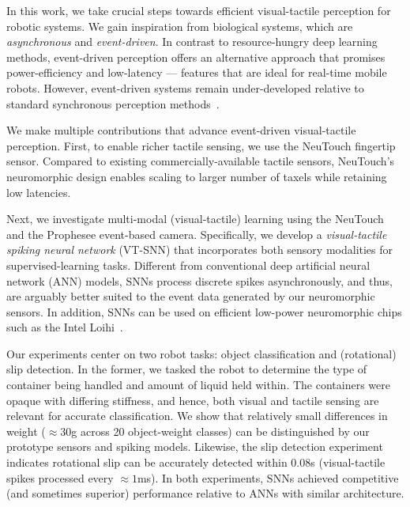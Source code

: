 \documentclass[fyp]{socreport}
\begin{document}

In this work, we take crucial steps towards efficient visual-tactile perception
for robotic systems. We gain inspiration from biological systems, which are
\emph{asynchronous} and \emph{event-driven}. In contrast to resource-hungry deep
learning methods, event-driven perception offers an alternative approach that
promises power-efficiency and low-latency --- features that are ideal for
real-time mobile robots. However, event-driven systems remain under-developed
relative to standard synchronous perception methods~\cite{pfeiffer2018deep}.

We make multiple contributions that advance event-driven visual-tactile
perception. First, to enable richer tactile sensing, we use the NeuTouch
fingertip sensor. Compared to existing commercially-available tactile sensors,
NeuTouch's neuromorphic design enables scaling to larger number of taxels while
retaining low latencies.

Next, we investigate multi-modal (visual-tactile) learning using the NeuTouch
and the Prophesee event-based camera. Specifically, we develop a
\emph{visual-tactile spiking neural network} (VT-SNN) that incorporates both
sensory modalities for supervised-learning tasks. Different from conventional
deep artificial neural network (ANN) models, SNNs process discrete spikes
asynchronously, and thus, are arguably better suited to the event data generated
by our neuromorphic sensors. In addition, SNNs can be used on efficient
low-power neuromorphic chips such as the Intel Loihi~\cite{davies2018loihi}.

Our experiments center on two robot tasks: object classification and
(rotational) slip detection. In the former, we tasked the robot to determine the
type of container being handled and amount of liquid held within. The containers
were opaque with differing stiffness, and hence, both visual and tactile sensing
are relevant for accurate classification. We show that relatively small
differences in weight ($\approx 30$g across 20 object-weight classes) can be
distinguished by our prototype sensors and spiking models. Likewise, the slip
detection experiment indicates rotational slip can be accurately detected within
$0.08$s (visual-tactile spikes processed every $\approx 1$ms). In both
experiments, SNNs achieved competitive (and sometimes superior) performance
relative to ANNs with similar architecture.
\end{document}
